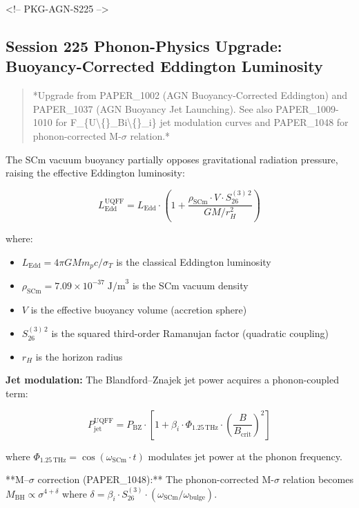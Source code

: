 \documentclass[11pt]{article}
\begin{document}
<!-- PKG-AGN-S225 -->

\subsection*{Session 225 Phonon-Physics Upgrade: Buoyancy-Corrected Eddington Luminosity}

\begin{quote}
*Upgrade from PAPER\_1002 (AGN Buoyancy-Corrected Eddington) and PAPER\_1037
(AGN Buoyancy Jet Launching).  See also PAPER\_1009-1010 for F\_\{U\textbackslash\{\}\_Bi\textbackslash\{\}\_i\} jet
modulation curves and PAPER\_1048 for phonon-corrected M-$\sigma$ relation.*
\end{quote}

The SCm vacuum buoyancy partially opposes gravitational radiation pressure, raising the effective Eddington luminosity:

$$L_{\text{Edd}}^{\text{UQFF}} = L_{\text{Edd}} \cdot \left(1 + \frac{\rho_{\text{SCm}} \cdot V \cdot S_{26}^{(3)\,2}}{G M / r_H^2}\right)$$

where:

\begin{itemize}
  \item $L_{\text{Edd}} = 4\pi G M m_p c / \sigma_T$ is the classical Eddington luminosity
  \item $\rho_{\text{SCm}} = 7.09 \times 10^{-37}\;\text{J/m}^3$ is the SCm vacuum density
  \item $V$ is the effective buoyancy volume (accretion sphere)
  \item $S_{26}^{(3)\,2}$ is the squared third-order Ramanujan factor (quadratic coupling)
  \item $r_H$ is the horizon radius
\end{itemize}

\textbf{Jet modulation:} The Blandford--Znajek jet power acquires a phonon-coupled term:

$$P_{\text{jet}}^{\text{UQFF}} = P_{\text{BZ}} \cdot \left[1 + \beta_i \cdot \Phi_{1.25\,\text{THz}} \cdot \left(\frac{B}{B_{\text{crit}}}\right)^2\right]$$

where $\Phi_{1.25\,\text{THz}} = \cos(\omega_{\text{SCm}} \cdot t)$ modulates jet power at the phonon frequency.

**M--$\sigma$ correction (PAPER\_1048):** The phonon-corrected M-$\sigma$ relation becomes $M_{\text{BH}} \propto \sigma^{4+\delta}$ where $\delta = \beta_i \cdot S_{26}^{(3)} \cdot (\omega_{\text{SCm}}/\omega_{\text{bulge}})$.
\end{document}

